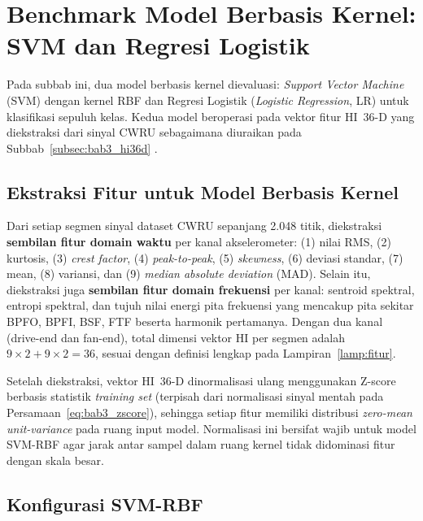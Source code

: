 \section{Benchmark Model Berbasis Kernel: SVM dan Regresi Logistik}
\label{sec:bab4_kernel}

Pada subbab ini, dua model berbasis kernel dievaluasi: \emph{Support Vector Machine} (SVM)
dengan kernel RBF dan Regresi Logistik (\emph{Logistic Regression}, LR) untuk klasifikasi sepuluh kelas.
Kedua model beroperasi pada vektor fitur HI~36-D yang diekstraksi dari
sinyal CWRU sebagaimana diuraikan pada
Subbab~\ref{subsec:bab3_hi36d} .

\subsection{Ekstraksi Fitur untuk Model Berbasis Kernel}
\label{subsec:bab4_kernel_fitur}

Dari setiap segmen sinyal dataset CWRU sepanjang 2.048 titik, diekstraksi
\textbf{sembilan fitur domain waktu} per kanal akselerometer:
(1) nilai RMS, (2) kurtosis, (3) \emph{crest factor},
(4) \emph{peak-to-peak}, (5) \emph{skewness}, (6) deviasi standar,
(7) mean, (8) variansi, dan (9) \emph{median absolute deviation} (MAD).
Selain itu, diekstraksi juga \textbf{sembilan fitur domain frekuensi} per kanal:
sentroid spektral, entropi spektral, dan tujuh nilai energi pita frekuensi
yang mencakup pita sekitar BPFO, BPFI, BSF, FTF beserta harmonik pertamanya.
Dengan dua kanal (drive-end dan fan-end), total dimensi vektor HI per segmen
adalah $9 \times 2 + 9 \times 2 = 36$, sesuai dengan definisi lengkap
pada Lampiran~\ref{lamp:fitur}.

Setelah diekstraksi, vektor HI~36-D dinormalisasi ulang menggunakan Z-score
berbasis statistik \emph{training set} (terpisah dari normalisasi sinyal
mentah pada Persamaan~\ref{eq:bab3_zscore}), sehingga setiap fitur memiliki
distribusi \emph{zero-mean unit-variance} pada ruang input model.
Normalisasi ini bersifat wajib untuk model SVM-RBF agar jarak antar sampel dalam
ruang kernel tidak didominasi fitur dengan skala besar.

\subsection{Konfigurasi SVM-RBF}
\label{subsec:bab4_svm_config}

